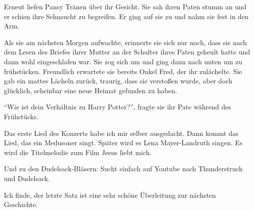 Erneut liefen Pansy Tränen über ihr Gesicht. Sie sah ihren Paten stumm an und er schien ihre Sehnsucht zu begreifen. Er ging auf sie zu und nahm sie fest in den Arm.

Als sie am nächsten Morgen aufwachte, erinnerte sie sich nur noch, dass sie nach dem Lesen des Briefes ihrer Mutter an der Schulter ihres Paten geheult hatte und dann wohl eingeschlafen war. Sie zog sich um und ging dann nach unten um zu frühstücken. Freundlich erwartete sie bereits Onkel Fred, der ihr zulächelte. Sie gab ein mattes Lächeln zurück, traurig, dass sie verstoßen wurde, aber doch glücklich, scheinbar eine neue Heimat gefunden zu haben.

\enquote{Wie ist dein Verhältnis zu Harry Potter?}, fragte sie ihr Pate während des Frühstücks.




\begin{kommentar}
Das erste Lied des Konzerts habe ich mir selber ausgedacht. Dann kommt das Lied, das ein Medusoner singt. Später wird es Lena Mayer-Landruth singen. Es wird die Titelmelodie zum Film Jesus liebt mich.
\end{kommentar}

\begin{kommentar}
Und zu den Dudelsack-Bläsern: Sucht einfach auf Youtube nach Thunderstruck und Dudelsack.
\end{kommentar}

\begin{kommentar}
Ich finde, der letzte Satz ist eine sehr schöne Überleitung zur nächsten Geschichte.
\end{kommentar}
